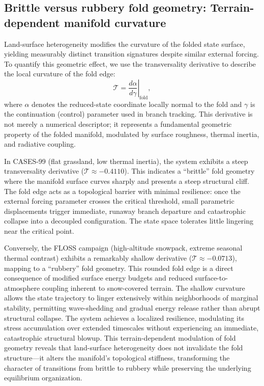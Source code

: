 \documentclass[12pt,a4paper]{article}
\begin{document}
\subsection{Brittle versus rubbery fold geometry: Terrain-dependent manifold curvature}

Land-surface heterogeneity modifies the curvature of the folded state surface, yielding measurably distinct transition signatures despite similar external forcing. To quantify this geometric effect, we use the transversality derivative to describe the local curvature of the fold edge:
\begin{equation}
\mathcal{T} = \left.\frac{d\alpha}{d\gamma}\right|_{\mathrm{fold}},
\end{equation}
where $\alpha$ denotes the reduced-state coordinate locally normal to the fold and $\gamma$ is the continuation (control) parameter used in branch tracking. This derivative is not merely a numerical descriptor; it represents a fundamental geometric property of the folded manifold, modulated by surface roughness, thermal inertia, and radiative coupling.

In CASES-99 (flat grassland, low thermal inertia), the system exhibits a steep transversality derivative ($\mathcal{T} \approx -0.4110$). This indicates a ``brittle'' fold geometry where the manifold surface curves sharply and presents a steep structural cliff. The fold edge acts as a topological barrier with minimal resilience: once the external forcing parameter crosses the critical threshold, small parametric displacements trigger immediate, runaway branch departure and catastrophic collapse into a decoupled configuration. The state space tolerates little lingering near the critical point.

Conversely, the FLOSS campaign (high-altitude snowpack, extreme seasonal thermal contrast) exhibits a remarkably shallow derivative ($\mathcal{T} \approx -0.0713$), mapping to a ``rubbery'' fold geometry. This rounded fold edge is a direct consequence of modified surface energy budgets and reduced surface-to-atmosphere coupling inherent to snow-covered terrain. The shallow curvature allows the state trajectory to linger extensively within neighborhoods of marginal stability, permitting wave-shedding and gradual energy release rather than abrupt structural collapse. The system achieves a localized resilience, modulating its stress accumulation over extended timescales without experiencing an immediate, catastrophic structural blowup. This terrain-dependent modulation of fold geometry reveals that land-surface heterogeneity does not invalidate the fold structure---it alters the manifold's topological stiffness, transforming the character of transitions from brittle to rubbery while preserving the underlying equilibrium organization.
\end{document}
